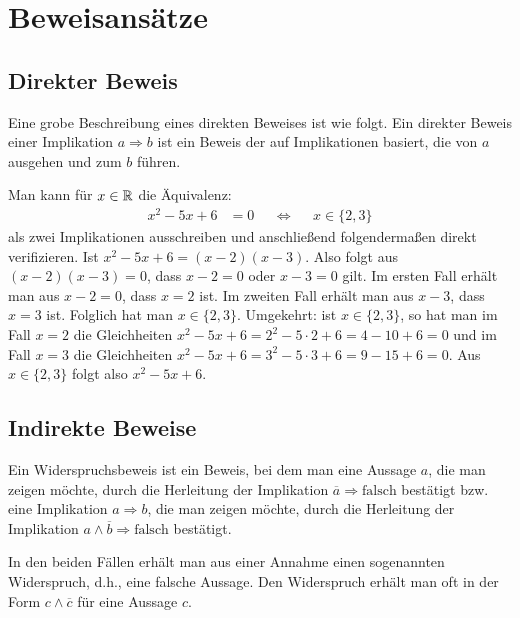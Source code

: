 \section{Beweisansätze} 

\subsection{Direkter Beweis} 

\begin{bem}
	Eine grobe Beschreibung eines direkten Beweises ist wie folgt. Ein direkter Beweis einer Implikation $a \Rightarrow b$ ist ein Beweis der auf Implikationen basiert, die von $a$ ausgehen und zum $b$ führen.
\end{bem} 

\begin{bem}
	Man kann für $x \in \mathbb{R}$ die Äquivalenz: 
	\begin{align*}
			x^2 - 5 x + 6 & = 0  &  & \Longleftrightarrow & & x \in \{2,3\}
	\end{align*} 
	als zwei Implikationen ausschreiben und anschließend 
	folgendermaßen direkt verifizieren. Ist $x^2 - 5 x + 6 = (x-2) (x-3)$. Also folgt aus $(x-2) (x-3)=0$, dass $x-2=0$ oder $x-3=0$ gilt. Im ersten Fall erhält man aus $x-2=0$, dass $x=2$ ist. Im zweiten Fall erhält man aus $x-3$, dass $x=3$ ist. Folglich hat man $x \in \{2,3\}$. Umgekehrt: ist $x \in \{2,3\}$, so hat man im Fall $x=2$ die Gleichheiten $x^2 - 5 x + 6= 2^2 - 5 \cdot 2 + 6 = 4- 10 + 6 =0$ und im Fall $x=3$ die Gleichheiten $x^2 - 5 x + 6 = 3^2 - 5 \cdot 3 + 6 = 9 - 15 + 6 = 0$. Aus $x \in \{2,3\}$ folgt also $x^2 - 5 x + 6$. 
\end{bem} 


\subsection{Indirekte Beweise} 


\begin{bem}
	Ein Widerspruchsbeweis ist ein Beweis, bei dem man eine Aussage $a$, die man zeigen möchte, durch die Herleitung der Implikation $\overline{a} \Rightarrow \text{falsch}$ bestätigt bzw. 
	eine Implikation $a \Rightarrow b$, die man zeigen möchte, durch die Herleitung der Implikation $a \wedge \overline{b} \Rightarrow \text{falsch}$ bestätigt. 
	
	In den beiden Fällen erhält man aus einer Annahme einen sogenannten Widerspruch, d.h., eine falsche Aussage. Den Widerspruch erhält man oft in der Form $c \wedge \overline{c}$ für eine Aussage $c$. 
\end{bem} 

